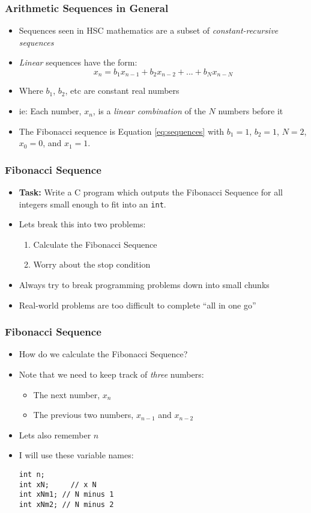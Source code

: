 \documentclass[14pt]{beamer}
\begin{document}
\begin{frame}
\frametitle{Arithmetic Sequences in General}
\begin{itemize}
\item Sequences seen in HSC mathematics are a subset of \textit{constant-recursive sequences}
\item \textit{Linear} sequences have the form:
\begin{equation}\label{eq:sequences}
x_n = b_1x_{n-1} + b_2x_{n-2} + ... + b_Nx_{n-N}
\end{equation}
\item Where $b_1$, $b_2$, etc are constant real numbers
\item ie: Each number, $x_n$, is a \textit{linear combination} of the $N$ numbers before it
\item The Fibonacci sequence is Equation \eqref{eq:sequences} with $b_1 = 1$, $b_2 = 1$, $N = 2$, $x_0 = 0$, and $x_1 = 1$.
\end{itemize}
\end{frame}

\begin{frame}
\frametitle{Fibonacci Sequence}
\begin{itemize}
\item \textbf{Task:} Write a C program which outputs the Fibonacci Sequence for all integers small enough to fit into an \texttt{int}.
\item Lets break this into two problems:
	\begin{enumerate}
		\item Calculate the Fibonacci Sequence
		\item Worry about the stop condition
	\end{enumerate}
\item Always try to break programming problems down into small chunks
\item Real-world problems are too difficult to complete ``all in one go''
\end{itemize}
\end{frame}


\begin{frame}[fragile]
\frametitle{Fibonacci Sequence}
\begin{itemize}
	\item How do we calculate the Fibonacci Sequence?
	\item Note that we need to keep track of \textit{three} numbers:
		\begin{itemize}
			\item The next number, $x_n$
			\item The previous two numbers, $x_{n-1}$ and $x_{n-2}$
		\end{itemize}
	\item Lets also remember $n$
	\item I will use these variable names:
		\begin{lstlisting}[style=CStyle]
int n;
int xN;		// x N
int xNm1; // N minus 1
int xNm2; // N minus 2
\end{lstlisting}
\end{itemize}
\end{frame}
\end{document}
